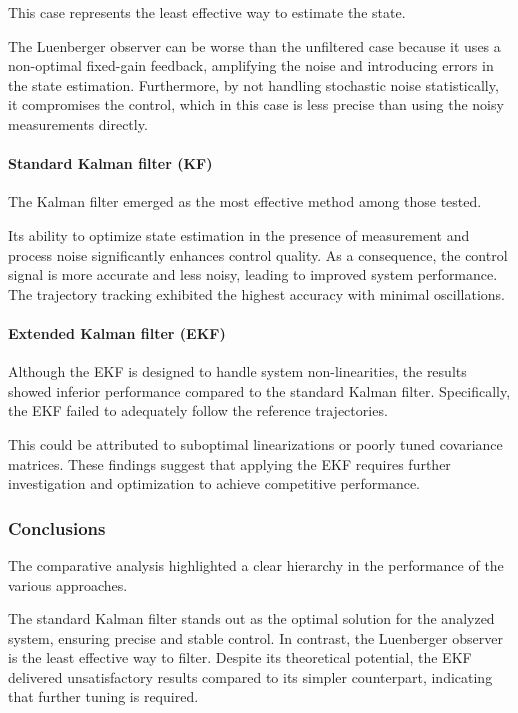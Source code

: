This case represents the least effective way to estimate the state.

The Luenberger observer can be worse than the unfiltered case because it uses a non-optimal fixed-gain feedback, amplifying the noise and introducing errors in the state estimation.
Furthermore, by not handling stochastic noise statistically, it compromises the control, which in this case is less precise than using the noisy measurements directly.

\paragraph{Standard Kalman filter (KF)}

The Kalman filter emerged as the most effective method among those tested.

Its ability to optimize state estimation in the presence of measurement and process noise significantly enhances control quality.
As a consequence, the control signal is more accurate and less noisy, leading to improved system performance.
The trajectory tracking exhibited the highest accuracy with minimal oscillations.

\paragraph{Extended Kalman filter (EKF)}

Although the EKF is designed to handle system non-linearities, the results showed inferior performance compared to the standard Kalman filter.
Specifically, the EKF failed to adequately follow the reference trajectories.

This could be attributed to suboptimal linearizations or poorly tuned covariance matrices.
These findings suggest that applying the EKF requires further investigation and optimization to achieve competitive performance.


\subsubsection{Conclusions}
\label{subsubsec:conclusions_filters_comparison}

The comparative analysis highlighted a clear hierarchy in the performance of the various approaches.

The standard Kalman filter stands out as the optimal solution for the analyzed system, ensuring precise and stable control.
In contrast, the Luenberger observer is the least effective way to filter.
Despite its theoretical potential, the EKF delivered unsatisfactory results compared to its simpler counterpart, indicating that further tuning is required.

